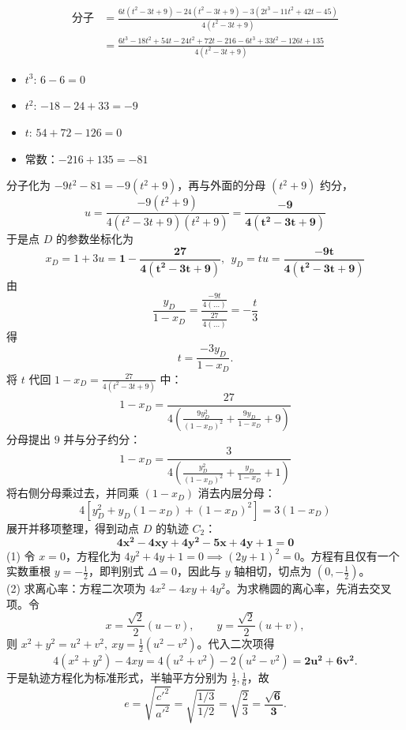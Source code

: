 \begin{solution}
\begin{align*}
 \text{分子}&= \frac{6t(t^2 - 3t + 9) - 24(t^2 - 3t + 9) - 3(2t^3 - 11t^2 + 42t - 45)}{4(t^2 - 3t + 9)}\\
 &= \frac{6t^3 - 18t^2 + 54t - 24t^2 + 72t - 216 - 6t^3 + 33t^2 - 126t + 135}{4(t^2 - 3t + 9)}
\end{align*}
\begin{itemize}
\item $t^3$: $6 - 6 = 0$
\item $t^2$: $-18 - 24 + 33 = -9$
\item $t$: $54 + 72 - 126 = 0$
\item 常数：$-216 + 135 = -81$
\end{itemize}
分子化为 $-9t^2 - 81 = -9(t^2 + 9)$，再与外面的分母 $(t^2 + 9)$ 约分，
$$u = \frac{-9(t^2 + 9)}{4(t^2 - 3t + 9)(t^2 + 9)} = \mathbf{\frac{-9}{4(t^2 - 3t + 9)}}$$
于是点 $D$ 的参数坐标化为
$$x_D = 1 + 3u = \mathbf{1 - \frac{27}{4(t^2 - 3t + 9)}},~~y_D = tu = \mathbf{\frac{-9t}{4(t^2 - 3t + 9)}}$$
由
$$\frac{y_D}{1 - x_D} = \frac{\frac{-9t}{4(\dots)}}{\frac{27}{4(\dots)}} = -\frac{t}{3}$$
得
$$t = \frac{-3y_D}{1 - x_D}.$$
将 $t$ 代回 $1 - x_D = \frac{27}{4(t^2 - 3t + 9)}$ 中：
$$1 - x_D = \frac{27}{4 \left( \frac{9y_D^2}{(1-x_D)^2} + \frac{9y_D}{1-x_D} + 9 \right)}$$
分母提出 $9$ 并与分子约分：
$$1 - x_D = \frac{3}{4 \left( \frac{y_D^2}{(1-x_D)^2} + \frac{y_D}{1-x_D} + 1 \right)}$$
将右侧分母乘过去，并同乘 $(1-x_D)$ 消去内层分母：
$$4 \left[ y_D^2 + y_D(1-x_D) + (1-x_D)^2 \right] = 3(1-x_D)$$
展开并移项整理，得到动点 $D$ 的轨迹 $C_2$：
$$\mathbf{4x^2 - 4xy + 4y^2 - 5x + 4y + 1 = 0}$$
(1) 令 $x = 0$，方程化为 $4y^2 + 4y + 1 = 0 \implies (2y + 1)^2 = 0$。方程有且仅有一个实数重根 $y = -\frac{1}{2}$，即判别式 $\Delta = 0$，因此与 $y$ 轴相切，切点为 $(0, -\frac{1}{2})$。\\
(2) 求离心率：方程二次项为 $4x^2 - 4xy + 4y^2$。为求椭圆的离心率，先消去交叉项。令
$$x = \frac{\sqrt{2}}{2}(u - v), \qquad y = \frac{\sqrt{2}}{2}(u + v),$$
则 $x^2 + y^2 = u^2 + v^2,\ xy = \frac{1}{2}(u^2 - v^2)$。代入二次项得
$$4(x^2 + y^2) - 4xy = 4(u^2 + v^2) - 2(u^2 - v^2) = \mathbf{2u^2 + 6v^2}.$$
于是轨迹方程化为标准形式，半轴平方分别为 $\frac{1}{2}, \frac{1}{6}$，故
$$e = \sqrt{\frac{c'^2}{a'^2}} = \sqrt{\frac{1/3}{1/2}} = \sqrt{\frac{2}{3}} = \mathbf{\frac{\sqrt{6}}{3}}.$$
\end{solution}

